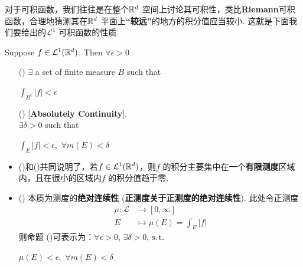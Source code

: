  	\vspace{2em}
 	对于可积函数，我们往往是在整个$\mathbb{R}^d$ 空间上讨论其可积性，类比\textbf{Riemann}可积函数，合理地猜测其在$\mathbb{R}^d$ 平面上\textbf{“较远”}的地方的积分值应当较小. 这就是下面我们要给出的$\mathcal{L}^1$ 可积函数的性质.
 	
 	\begin{proposition}\label{prop 3.1.6}
 		Suppose $f \in \mathcal{L}^{1}(\mathbb{R}^d)$. Then $\forall \epsilon > 0$
 		\begin{enumerate}
 			\item[(\rmnum{1})]$\exists$ a set of finite measure $B$ such that
 			\begin{center}
 				$\int_{B^c}{\left| f \right|} < \epsilon$
 			\end{center}
 			
 			\item[(\rmnum{2})][\textbf{Absolutely Continuity}].\\
 			$\exists \delta > 0$ such that
 			\begin{center}
 				$\int_{E}{\left| f \right|} < \epsilon , \,\, \forall m(E) < \delta$
 			\end{center}
 		\end{enumerate}
 		
 		\vspace{2em}
 		\begin{rmk}
 			\begin{itemize}
 				\item ()和()共同说明了，若$f \in \mathcal{L}^{1}(\mathbb{R}^d)$，则$f$ 的积分主要集中在一个\textbf{有限测度}区域内，且在很小的区域内$f$ 的积分值趋于零.
 				
 				\vspace{2em}
 				
 				\item () 本质为测度的\textbf{绝对连续性} (\textbf{正测度关于正测度的绝对连续性}). 此处令正测度
 				\begin{align}
 					\mu : \mathcal{L} &\longrightarrow [0 , \infty] \\
 					E &\longmapsto \mu(E) = \int_{E}{\left| f \right|}
 				\end{align}
 				则命题 ()可表示为：$\forall \epsilon > 0$, $\exists \delta > 0$, $\operatorname{s.t.}$
 				\begin{center}
 					$\mu(E) < \epsilon , \,\, \forall m(E) < \delta$
 				\end{center}
 			\end{itemize}
 		\end{rmk}
 	

\end{proposition}
